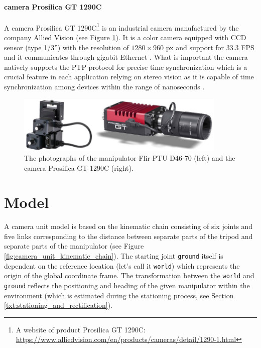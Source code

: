 \paragraph{camera Prosilica GT 1290C} A camera Prosilica GT 1290C\footnote{A website of product Prosilica GT 1290C: \url{https://www.alliedvision.com/en/products/cameras/detail/1290-1.html}} is an industrial camera manufactured by the company Allied Vision (see Figure \ref{fig:prosilica_gt1290c_flir_ptud4670}). It is a color camera equipped with CCD sensor (type 1/3'') with the resolution of $1280 \times 960$ px and support for $33.3$ FPS and it communicates through gigabit Ethernet \cite{Prosilica_gt1290c}. What is important the camera natively supports the PTP protocol for precise time synchronization which is a crucial feature in each application relying on stereo vision as it is capable of time synchronization among devices within the range of nanoseconds \cite{PTP}.

\begin{figure}[htb]
	\centering
	\includegraphics[width=10cm]{fig/prosilica_gt1290c_flir_ptud4670.jpg}
	\caption{The photographs of the manipulator Flir PTU D46-70 (left) and the camera Prosilica GT 1290C (right).}
	\label{fig:prosilica_gt1290c_flir_ptud4670}
\end{figure}

\section{Model} \label{txt:model}

A camera unit model is based on the kinematic chain consisting of six joints and five links corresponding to the distance between separate parts of the tripod and separate parts of the manipulator (see Figure \ref{fig:camera_unit_kinematic_chain}). The starting joint \texttt{ground} itself is dependent on the reference location (let's call it \texttt{world}) which represents the origin of the global coordinate frame. The transformation between the \texttt{world} and \texttt{ground} reflects the positioning and heading of the given manipulator within the environment (which is estimated during the stationing process, see Section \ref{txt:stationing_and_rectification}).

